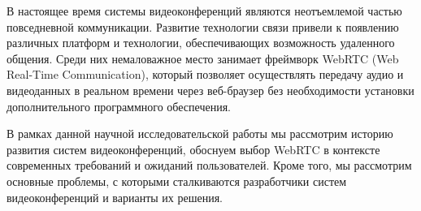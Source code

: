 
В настоящее время системы видеоконференций являются неотъемлемой частью повседневной коммуникации. Развитие технологии связи привели к появлению различных платформ и технологии, обеспечивающих возможность удаленного общения. Среди них немаловажное место занимает фреймворк WebRTC (Web Real-Time Communication), который позволяет осуществлять передачу аудио и видеоданных в реальном времени через веб-браузер без необходимости установки дополнительного программного обеспечения.

В рамках данной научной исследовательской работы мы рассмотрим историю развития систем видеоконференций, обоснуем выбор WebRTC в контексте современных требований и ожиданий пользователей. Кроме того, мы рассмотрим основные проблемы, с которыми сталкиваются разработчики систем видеоконференций и варианты их решения.

\pagebreak